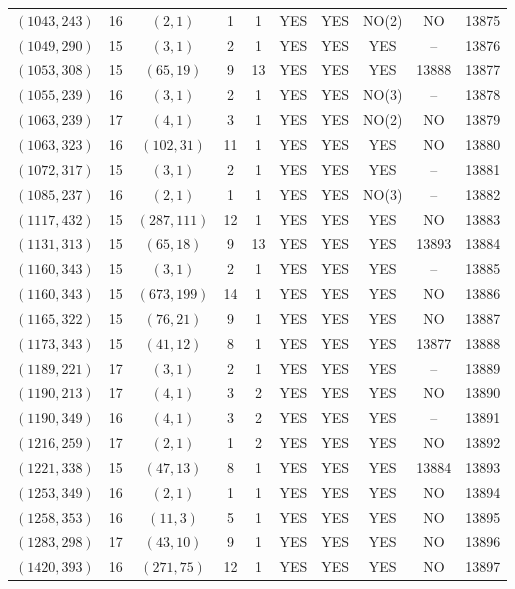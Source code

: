 \begin{longtable}{|c|c|c|c|c|c|c|c|c|c|}
$(1043, 243)$ & 16 & $(2, 1)$ & 1 & 1 & YES & YES & NO(2) & NO & 13875\\
$(1049, 290)$ & 15 & $(3, 1)$ & 2 & 1 & YES & YES & YES & -- & 13876\\
$(1053, 308)$ & 15 & $(65, 19)$ & 9 & 13 & YES & YES & YES & 13888 & 13877\\
$(1055, 239)$ & 16 & $(3, 1)$ & 2 & 1 & YES & YES & NO(3) & -- & 13878\\
$(1063, 239)$ & 17 & $(4, 1)$ & 3 & 1 & YES & YES & NO(2) & NO & 13879\\
$(1063, 323)$ & 16 & $(102, 31)$ & 11 & 1 & YES & YES & YES & NO & 13880\\
$(1072, 317)$ & 15 & $(3, 1)$ & 2 & 1 & YES & YES & YES & -- & 13881\\
$(1085, 237)$ & 16 & $(2, 1)$ & 1 & 1 & YES & YES & NO(3) & -- & 13882\\
$(1117, 432)$ & 15 & $(287, 111)$ & 12 & 1 & YES & YES & YES & NO & 13883\\
$(1131, 313)$ & 15 & $(65, 18)$ & 9 & 13 & YES & YES & YES & 13893 & 13884\\
$(1160, 343)$ & 15 & $(3, 1)$ & 2 & 1 & YES & YES & YES & -- & 13885\\
$(1160, 343)$ & 15 & $(673, 199)$ & 14 & 1 & YES & YES & YES & NO & 13886\\
$(1165, 322)$ & 15 & $(76, 21)$ & 9 & 1 & YES & YES & YES & NO & 13887\\
$(1173, 343)$ & 15 & $(41, 12)$ & 8 & 1 & YES & YES & YES & 13877 & 13888\\
$(1189, 221)$ & 17 & $(3, 1)$ & 2 & 1 & YES & YES & YES & -- & 13889\\
$(1190, 213)$ & 17 & $(4, 1)$ & 3 & 2 & YES & YES & YES & NO & 13890\\
$(1190, 349)$ & 16 & $(4, 1)$ & 3 & 2 & YES & YES & YES & -- & 13891\\
$(1216, 259)$ & 17 & $(2, 1)$ & 1 & 2 & YES & YES & YES & NO & 13892\\
$(1221, 338)$ & 15 & $(47, 13)$ & 8 & 1 & YES & YES & YES & 13884 & 13893\\
$(1253, 349)$ & 16 & $(2, 1)$ & 1 & 1 & YES & YES & YES & NO & 13894\\
$(1258, 353)$ & 16 & $(11, 3)$ & 5 & 1 & YES & YES & YES & NO & 13895\\
$(1283, 298)$ & 17 & $(43, 10)$ & 9 & 1 & YES & YES & YES & NO & 13896\\
$(1420, 393)$ & 16 & $(271, 75)$ & 12 & 1 & YES & YES & YES & NO & 13897\\

\end{longtable}
